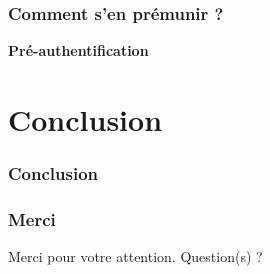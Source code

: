 \documentclass[svgnames]{beamer}
\begin{document}
\begin{frame}
 \frametitle{Comment s'en prémunir ?}
 
 \textbf{Pré-authentification}
\end{frame}


\section*{Conclusion}
\begin{frame}
  \frametitle{Conclusion}
  
  

\end{frame}


\begin{frame}
  \frametitle{Merci}
  \begin{center}
    Merci pour votre attention. Question(s) ?
  \end{center}
\end{frame}
\end{document}
